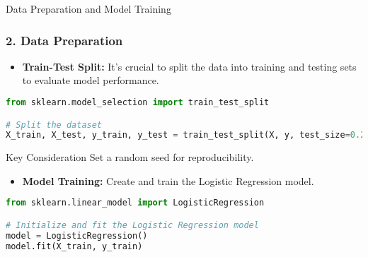 \documentclass[aspectratio=169]{beamer}
\begin{document}
\begin{frame}{Data Preparation and Model Training}
    \frametitle{2. Data Preparation}
    \begin{itemize}
        \item \textbf{Train-Test Split:}
        It’s crucial to split the data into training and testing sets to evaluate model performance.
    \end{itemize}
    \begin{lstlisting}[language=Python]
from sklearn.model_selection import train_test_split

# Split the dataset
X_train, X_test, y_train, y_test = train_test_split(X, y, test_size=0.2, random_state=42)
    \end{lstlisting}
    \begin{block}{Key Consideration}
        Set a random seed for reproducibility.
    \end{block}
    
    \begin{itemize}
        \item \textbf{Model Training:} Create and train the Logistic Regression model.
    \end{itemize}
    \begin{lstlisting}[language=Python]
from sklearn.linear_model import LogisticRegression

# Initialize and fit the Logistic Regression model
model = LogisticRegression()
model.fit(X_train, y_train)
    \end{lstlisting}
\end{frame}
\end{document}
